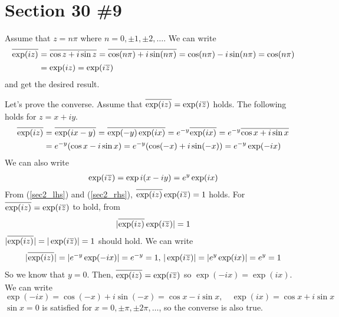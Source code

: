 \documentclass{scrartcl}
\newcommand\Overline[2][0.4pt]{%
  \begin{tikzpicture}[baseline=(a.base)]
    \node[inner xsep=0pt,inner ysep=1.5pt] (a) {$#2$};
    \draw[line width= #1] (a.north west) -- (a.north east);
  \end{tikzpicture}
}
\begin{document}
\section{Section 30 \#9}
Assume that \(z = n\pi\) where \(n = 0, \pm 1, \pm 2, \dots\).
We can write
\begin{align*}
  \Overline{\exp(iz)} &= \Overline{\cos z + i\sin z} = \Overline{\cos (n\pi) + i\sin (n\pi)} = \cos (n\pi) - i\sin (n\pi) = \cos (n\pi) \\
                      &= \exp(iz) = \exp(i\Overline{z})
\end{align*}
and get the desired result.

Let's prove the converse.
Assume that \(\Overline{\exp(iz)} = \exp(i\Overline{z})\) holds.
The following holds for \(z = x + iy\).
\begin{align}
  \nonumber \Overline{\exp(iz)} &= \Overline{\exp(ix - y)} = \Overline{\exp(-y)\exp(ix)} = e^{-y} \Overline{\exp(ix)} = e^{-y} \Overline{\cos x + i\sin x} \\
                      \label{sec2_lhs}&= e^{-y} (\cos x - i\sin x) = e^{-y} (\cos (-x) + i\sin(-x)) = e^{-y} \exp(-ix)
\end{align}
We can also write
\begin{align}\label{sec2_rhs}
  \exp(i\Overline{z}) = \exp{i(x - iy)} = e^y \exp(ix)
\end{align}
From (\ref{sec2_lhs}) and (\ref{sec2_rhs}), \(\Overline{\exp(iz)} \exp(i\Overline{z}) = 1\) holds.
For \(\Overline{\exp(iz)} = \exp(i\Overline{z})\) to hold, from
\[
  |\Overline{\exp(iz)} \exp(i\Overline{z})| = 1
\]
\(|\Overline{\exp(iz)}| = |\exp(i\Overline{z})| = 1\) should hold.
We can write
\[
  |\Overline{\exp(iz)}| = |e^{-y} \exp(-ix)| = e^{-y} = 1,\, |\exp(i\Overline{z})| = |e^y \exp(ix)| = e^y = 1
\]
So we know that \(y = 0\).
Then, \(\Overline{\exp(iz)} = \exp(i\Overline{z})\) so \(\exp(-ix) = \exp(ix)\).
We can write
\[
  \exp(-ix) = \cos (-x) + i\sin(-x) = \cos x - i\sin x, \quad \exp(ix) = \cos x + i\sin x
\]
\(\sin x = 0\) is satisfied for \(x = 0, \pm \pi, \pm 2\pi, \dots\), so the converse is also true.
\end{document}
